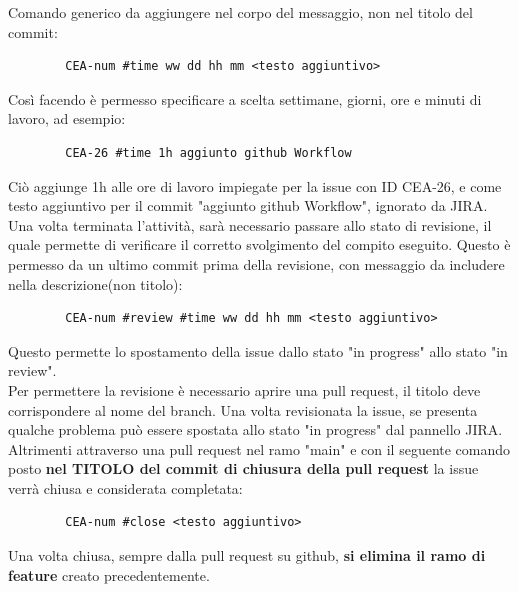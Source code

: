 	Comando generico da aggiungere nel corpo del messaggio, non nel titolo del commit:
	\begin{lstlisting}
		CEA-num #time ww dd hh mm <testo aggiuntivo>
	\end{lstlisting}
	Così facendo è permesso specificare a scelta settimane, giorni, ore e minuti di lavoro, ad esempio:
	\begin{lstlisting}
		CEA-26 #time 1h aggiunto github Workflow
	\end{lstlisting}
	Ciò aggiunge 1h alle ore di lavoro impiegate per la issue con ID CEA-26, e come testo aggiuntivo per il commit "aggiunto github Workflow", ignorato da JIRA.\\
	Una volta terminata l'attività, sarà necessario passare allo stato di revisione, il quale permette di verificare il corretto svolgimento del compito eseguito. Questo è permesso da un ultimo commit prima della revisione, con messaggio da includere nella descrizione(non titolo):
	\begin{lstlisting}
		CEA-num #review #time ww dd hh mm <testo aggiuntivo>
	\end{lstlisting}
	Questo permette lo spostamento della issue dallo stato "in progress" allo stato "in review".\\
	Per permettere la revisione è necessario aprire una pull request, il titolo deve corrispondere al nome del branch.
	Una volta revisionata la issue, se presenta qualche problema può essere spostata allo stato "in progress" dal pannello JIRA. Altrimenti attraverso una pull request nel ramo "main" e con il seguente comando posto \textbf{nel TITOLO del commit di chiusura della pull request} la issue verrà chiusa e considerata completata:
	\begin{lstlisting}
		CEA-num #close <testo aggiuntivo>
	\end{lstlisting}
	Una volta chiusa, sempre dalla pull request su github, \textbf{si elimina il ramo di feature} creato precedentemente.
